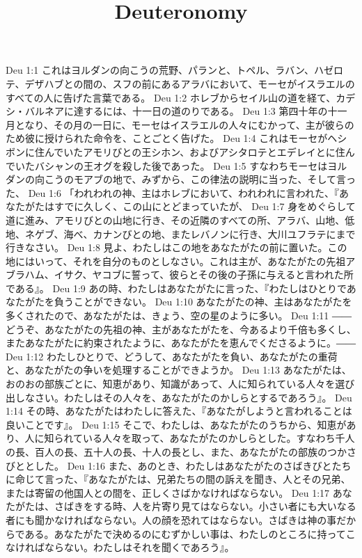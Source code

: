 

\title{Deuteronomy}

Deu 1:1  これはヨルダンの向こうの荒野、パランと、トペル、ラバン、ハゼロテ、デザハブとの間の、スフの前にあるアラバにおいて、モーセがイスラエルのすべての人に告げた言葉である。
Deu 1:2  ホレブからセイル山の道を経て、カデシ・バルネアに達するには、十一日の道のりである。
Deu 1:3  第四十年の十一月となり、その月の一日に、モーセはイスラエルの人々にむかって、主が彼らのため彼に授けられた命令を、ことごとく告げた。
Deu 1:4  これはモーセがヘシボンに住んでいたアモリびとの王シホン、およびアシタロテとエデレイとに住んでいたバシャンの王オグを殺した後であった。
Deu 1:5  すなわちモーセはヨルダンの向こうのモアブの地で、みずから、この律法の説明に当った、そして言った、
Deu 1:6  「われわれの神、主はホレブにおいて、われわれに言われた、『あなたがたはすでに久しく、この山にとどまっていたが、
Deu 1:7  身をめぐらして道に進み、アモリびとの山地に行き、その近隣のすべての所、アラバ、山地、低地、ネゲブ、海べ、カナンびとの地、またレバノンに行き、大川ユフラテにまで行きなさい。
Deu 1:8  見よ、わたしはこの地をあなたがたの前に置いた。この地にはいって、それを自分のものとしなさい。これは主が、あなたがたの先祖アブラハム、イサク、ヤコブに誓って、彼らとその後の子孫に与えると言われた所である』。
Deu 1:9  あの時、わたしはあなたがたに言った、『わたしはひとりであなたがたを負うことができない。
Deu 1:10  あなたがたの神、主はあなたがたを多くされたので、あなたがたは、きょう、空の星のように多い。
Deu 1:11  ――どうぞ、あなたがたの先祖の神、主があなたがたを、今あるより千倍も多くし、またあなたがたに約束されたように、あなたがたを恵んでくださるように。――
Deu 1:12  わたしひとりで、どうして、あなたがたを負い、あなたがたの重荷と、あなたがたの争いを処理することができようか。
Deu 1:13  あなたがたは、おのおの部族ごとに、知恵があり、知識があって、人に知られている人々を選び出しなさい。わたしはその人々を、あなたがたのかしらとするであろう』。
Deu 1:14  その時、あなたがたはわたしに答えた、『あなたがしようと言われることは良いことです』。
Deu 1:15  そこで、わたしは、あなたがたのうちから、知恵があり、人に知られている人々を取って、あなたがたのかしらとした。すなわち千人の長、百人の長、五十人の長、十人の長とし、また、あなたがたの部族のつかさびととした。
Deu 1:16  また、あのとき、わたしはあなたがたのさばきびとたちに命じて言った、『あなたがたは、兄弟たちの間の訴えを聞き、人とその兄弟、または寄留の他国人との間を、正しくさばかなければならない。
Deu 1:17  あなたがたは、さばきをする時、人を片寄り見てはならない。小さい者にも大いなる者にも聞かなければならない。人の顔を恐れてはならない。さばきは神の事だからである。あなたがたで決めるのにむずかしい事は、わたしのところに持ってこなければならない。わたしはそれを聞くであろう』。
